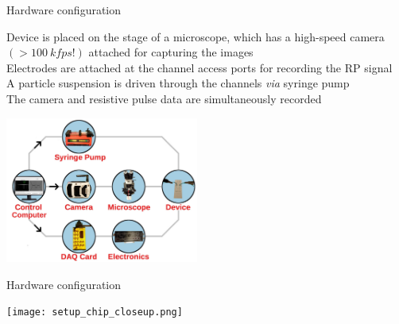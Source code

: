 

\begin{frame}[c]{Hardware configuration}


	{\footnotesize
		Device is placed on the stage of a microscope, which has a high-speed camera $\left(>\SI{100}{kfps}!\right)$ attached for capturing the images \\
		\vspace{.1in}
		Electrodes are attached at the channel access ports for recording the RP signal \\
		\vspace{.1in}
		A particle suspension is driven through the channels \textit{via} syringe pump \\
		\vspace{.1in}
		The camera and resistive pulse data are simultaneously recorded \\
	}
	
	{\centering 
		\includegraphics[width=2.5in]{hardware.jpg} \\
		\par
	}
	

\end{frame}





\begin{frame}[c]{Hardware configuration}


	{\centering 
		\texttt{[image: setup\_chip\_closeup.png]} \\
		\par
	}
	
	

\end{frame}



